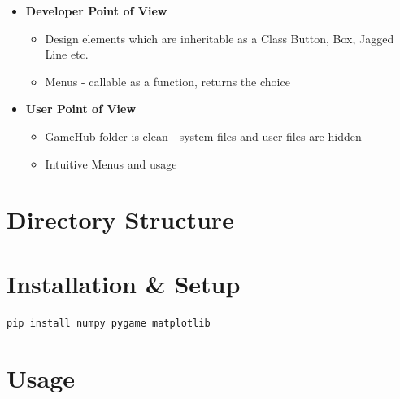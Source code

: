 \documentclass[12pt]{article}
\begin{document}
\begin{itemize}
\begin{itemize}
        \item \textbf{Developer Point of View}
            \begin{itemize}
                \item Design elements which are inheritable as a Class Button, Box, Jagged Line etc.
                \item Menus - callable as a function, returns the choice                 
            \end{itemize}
        \item \textbf{User Point of View}
            \begin{itemize}
                \item GameHub folder is clean - system files and user files are hidden
                \item Intuitive Menus and usage             
            \end{itemize}
        
    \end{itemize}
    

\end{itemize}


\section{Directory Structure}


\section{Installation \& Setup}
\begin{verbatim}
pip install numpy pygame matplotlib
\end{verbatim}

\section{Usage}
\end{document}
